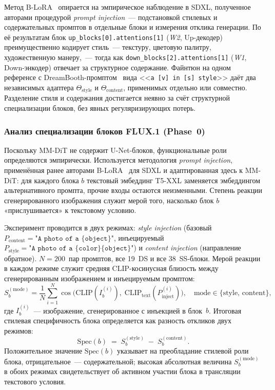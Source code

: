 Метод B-LoRA~\cite{frenkel2024blora} опирается на эмпирическое наблюдение в SDXL, полученное авторами процедурой \textit{prompt injection}~--- подстановкой стилевых и содержательных промптов в отдельные блоки и измерения отклика генерации. По её результатам блок \texttt{up\_blocks[0].attentions[1]} (\textit{W2}, Up-декодер) преимущественно кодирует стиль~--- текстуру, цветовую палитру, художественную манеру,~--- тогда как \texttt{down\_blocks[2].attentions[1]} (\textit{W1}, Down-энкодер) отвечает за структурное содержание. Файнтюн на одном референсе с DreamBooth-промптом~\cite{ruiz2023dreambooth} вида <<\texttt{a [v] in [s] style}>> даёт два независимых адаптера $\Theta_\text{style}$ и $\Theta_\text{content}$, применимых отдельно или совместно. Разделение стиля и содержания достигается неявно за счёт структурной специализации блоков, без явных регуляризирующих потерь.

\subsubsection*{Анализ специализации блоков FLUX.1 (Phase~0)}

Поскольку MM-DiT не содержит U-Net-блоков, функциональные роли определяются эмпирически. Используется методология \textit{prompt injection}, применённая ранее авторами B-LoRA~\cite{frenkel2024blora} для SDXL и адаптированная здесь к MM-DiT: для каждого блока $b$ текстовый эмбеддинг T5-XXL заменяется эмбеддингом альтернативного промпта, прочие входы остаются неизменными. Степень реакции сгенерированного изображения служит мерой того, насколько блок $b$ «прислушивается» к текстовому условию.

Эксперимент проводится в двух режимах: \textit{style injection} (базовый $P_\text{content}=\texttt{"A photo of a \{object\}"}$, инъецируемый $P_\text{style}=\texttt{"A photo of a \{color\} \{object\}"}$) и \textit{content injection} (направление обратное). $N{=}200$~пар промптов, все 19~DS и все 38~SS-блоки. Мерой реакции в каждом режиме служит средняя CLIP-косинусная близость между сгенерированным изображением и инъецируемым промптом:
\begin{equation}
    S_b^{(\text{mode})} = \frac{1}{N} \sum_{i=1}^{N}
        \cos\!\bigl(\mathrm{CLIP}(I_b^{(i)}),\; \mathrm{CLIP}_\text{text}(P_\text{inject}^{(i)})\bigr),
    \quad \text{mode} \in \{\text{style},\,\text{content}\},
    \label{eq:phase0_score}
\end{equation}
где $I_b^{(i)}$~--- изображение, сгенерированное с инъекцией в блок~$b$. Итоговая стилевая специфичность блока определяется как разность откликов двух режимов:
\begin{equation}
    \mathrm{Spec}(b) \;=\; S_b^{(\text{style})} \;-\; S_b^{(\text{content})}.
    \label{eq:phase0_specificity}
\end{equation}
Положительное значение $\mathrm{Spec}(b)$ указывает на преобладание стилевой роли блока, отрицательное~--- содержательной; высокая абсолютная величина $S_b^{(\text{mode})}$ в обоих режимах свидетельствует об активном участии блока в трансляции текстового условия.

